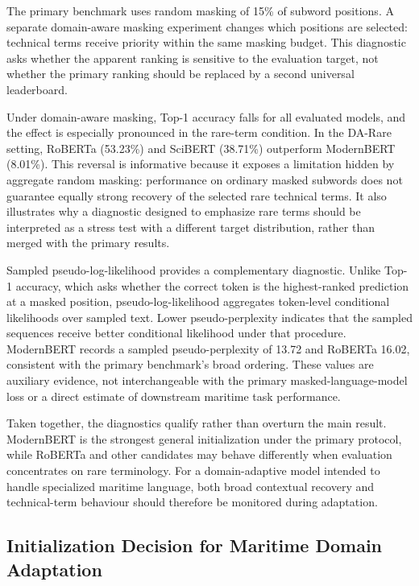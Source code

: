 The primary benchmark uses random masking of 15\% of subword positions. A separate domain-aware masking experiment changes which positions are selected: technical terms receive priority within the same masking budget. This diagnostic asks whether the apparent ranking is sensitive to the evaluation target, not whether the primary ranking should be replaced by a second universal leaderboard.

Under domain-aware masking, Top-1 accuracy falls for all evaluated models, and the effect is especially pronounced in the rare-term condition. In the DA-Rare setting, RoBERTa (53.23\%) and SciBERT (38.71\%) outperform ModernBERT (8.01\%). This reversal is informative because it exposes a limitation hidden by aggregate random masking: performance on ordinary masked subwords does not guarantee equally strong recovery of the selected rare technical terms. It also illustrates why a diagnostic designed to emphasize rare terms should be interpreted as a stress test with a different target distribution, rather than merged with the primary results.

Sampled pseudo-log-likelihood provides a complementary diagnostic. Unlike Top-1 accuracy, which asks whether the correct token is the highest-ranked prediction at a masked position, pseudo-log-likelihood aggregates token-level conditional likelihoods over sampled text. Lower pseudo-perplexity indicates that the sampled sequences receive better conditional likelihood under that procedure. ModernBERT records a sampled pseudo-perplexity of 13.72 and RoBERTa 16.02, consistent with the primary benchmark's broad ordering. These values are auxiliary evidence, not interchangeable with the primary masked-language-model loss or a direct estimate of downstream maritime task performance.

Taken together, the diagnostics qualify rather than overturn the main result. ModernBERT is the strongest general initialization under the primary protocol, while RoBERTa and other candidates may behave differently when evaluation concentrates on rare terminology. For a domain-adaptive model intended to handle specialized maritime language, both broad contextual recovery and technical-term behaviour should therefore be monitored during adaptation.

\subsection{Initialization Decision for Maritime Domain Adaptation}
\label{sec:decision}


